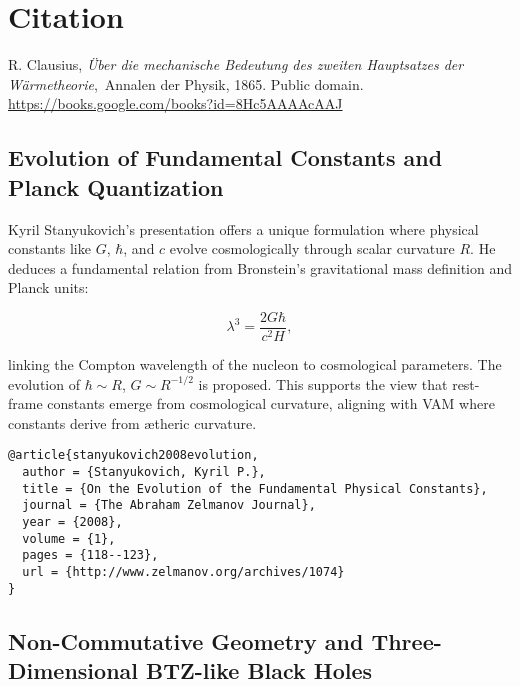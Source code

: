 \section*{Citation}
\begingroup
\renewcommand{\section}[2]{}%
\begin{thebibliography}{9}

R. Clausius, \textit{\"Uber die mechanische Bedeutung des zweiten Hauptsatzes der W\"armetheorie},\ Annalen der Physik, 1865. Public domain. \\ \url{https://books.google.com/books?id=8Hc5AAAAcAAJ}

\end{thebibliography}
\endgroup


\subsection{Evolution of Fundamental Constants and Planck Quantization}

Kyril Stanyukovich's presentation \cite{stanyukovich2008evolution} offers a unique formulation where physical constants like $G$, $\hbar$, and $c$ evolve cosmologically through scalar curvature $R$. He deduces a fundamental relation from Bronstein's gravitational mass definition and Planck units:

\begin{equation}
\lambda^3 = \frac{2G\hbar}{c^2 H},
\end{equation}

linking the Compton wavelength of the nucleon to cosmological parameters. The evolution of $\hbar \sim R$, $G \sim R^{-1/2}$ is proposed. This supports the view that rest-frame constants emerge from cosmological curvature, aligning with VAM where constants derive from ætheric curvature.

\begin{verbatim}
@article{stanyukovich2008evolution,
  author = {Stanyukovich, Kyril P.},
  title = {On the Evolution of the Fundamental Physical Constants},
  journal = {The Abraham Zelmanov Journal},
  year = {2008},
  volume = {1},
  pages = {118--123},
  url = {http://www.zelmanov.org/archives/1074}
}
\end{verbatim}

\subsection{Non-Commutative Geometry and Three-Dimensional BTZ-like Black Holes}

